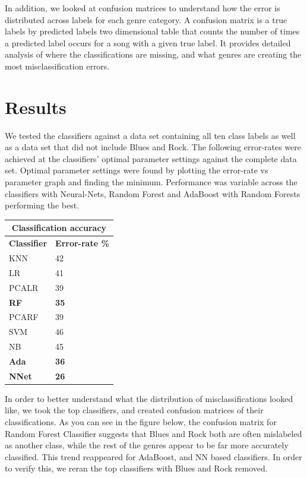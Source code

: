 \documentclass{article} %
\begin{document}
In addition, we looked at confusion matrices to understand how the error is distributed across labels for each genre category. A confusion matrix is a true labels by predicted labels two dimensional table that counts the number of times a predicted label occurs for a song with a given true label. It provides detailed analysis of where the classifications are missing, and what genres are creating the most misclassification errors.

\section{Results}
We tested the classifiers against a data set containing all ten class labels as well as a data set that did not include Blues and Rock. The following error-rates were achieved at the classifiers' optimal parameter settings against the complete data set. Optimal parameter settings were found by plotting the error-rate vs parameter graph and finding the minimum.  Performance was variable across the classifiers with Neural-Nets, Random Forest and AdaBoost with Random Forests performing the best. \newline
\begin{center}
	\begin{tabular}{ |p{2cm}|p{2.3cm}|}
		\hline
		\multicolumn{2}{|c|}{\textbf{Classification accuracy}} \\
		\hline
		\textbf{Classifier} & \textbf{Error-rate \%} \\
		\hline
		KNN & 42 \\
		LR & 41  \\
		PCALR & 39 \\
		\textbf{RF}    &  \textbf{35} \\
		PCARF & 39 \\
		SVM & 46 \\
		NB & 45 \\
		\textbf{Ada} & \textbf{36} \\
		\textbf{NNet} & \textbf{26} \\
		\hline
	\end{tabular}
\end{center}
In order to better understand what the distribution of misclassifications looked like, we took the top classifiers, and created confusion matrices of their classifications. As you can see in the figure below, the confusion matrix for Random Forest Classifier suggests that Blues and Rock both are often mislabeled as another class, while the rest of the genres appear to be far more accurately classified. This trend reappeared for AdaBoost, and NN based classifiers. In order to verify this, we reran the top classifiers with Blues and Rock removed.
\end{document}
